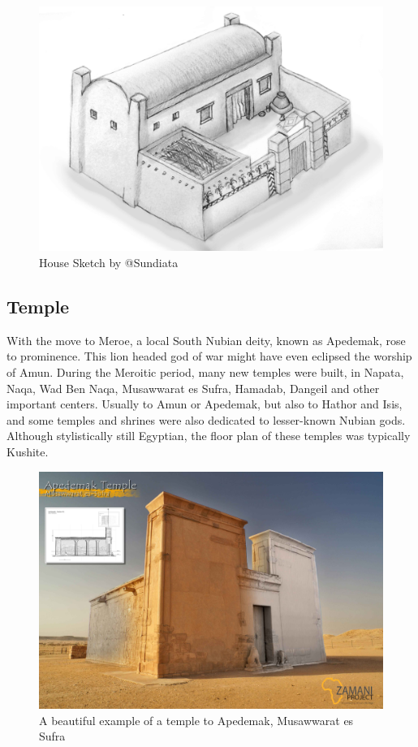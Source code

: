 \documentclass[a4paper,12pt]{scrreprt}
\begin{document}
\begin{figure}[H]
	\centering
	\includegraphics[width=\textwidth]{img/house/sundiata_house_sketch}
	\caption{House Sketch by @Sundiata}\label{fig:house_sketch}
\end{figure}

\subsection{Temple}

With the move to Meroe, a local South Nubian deity, known as Apedemak, rose to prominence. This lion headed god of war might have even eclipsed the worship of Amun. During the Meroitic period, many new temples were built, in Napata, Naqa, Wad Ben Naqa, Musawwarat es Sufra, Hamadab, Dangeil and other important centers. Usually to Amun or Apedemak, but also to Hathor and Isis, and some temples and shrines were also dedicated to lesser-known Nubian gods. Although stylistically still Egyptian, the floor plan of these temples was typically Kushite. 

\begin{figure}[H]
	\centering
	\includegraphics[width=\textwidth]{img/temple/apedemak_temple}
	\caption{A beautiful example of a temple to Apedemak, Musawwarat es Sufra}
\end{figure}
\end{document}

